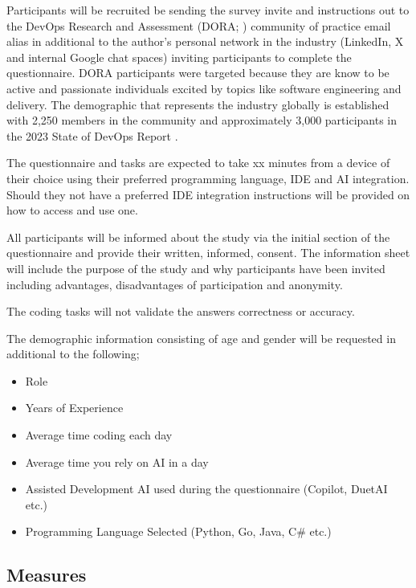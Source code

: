\documentclass[man]{apa7}
\begin{document}
Participants will be recruited be sending the survey invite and instructions out to the  DevOps Research and Assessment (DORA; \cite{Humble2018Accelerate:Organizations}) community of practice \parencite{DORACommunity} email alias in additional to the author's personal network in the industry (LinkedIn, X and internal Google chat spaces) inviting participants to complete the questionnaire. DORA participants were targeted because they are know to be active and passionate individuals excited by topics like software engineering and delivery. The demographic that represents the industry globally is established with 2,250 members in the community and approximately 3,000 participants in the 2023 State of DevOps Report \parencite{2023State2023}.

The questionnaire and tasks are expected to take xx minutes from a device of their choice using their preferred programming language, IDE and AI integration. Should they not have a preferred IDE integration instructions will be provided on how to access and use one.

All participants will be informed about the study via the initial section of the questionnaire and provide their written, informed, consent. The information sheet will include the purpose of the study and why participants have been invited including advantages, disadvantages of participation and anonymity. 

The coding tasks will not validate the answers correctness or accuracy.


The demographic information consisting of age and gender will be requested in additional to the following;

\begin{itemize}
    \item Role
    \item Years of Experience
    \item Average time coding each day
    \item Average time you rely on AI in a day
    \item Assisted Development AI used during the questionnaire (Copilot, DuetAI etc.)
    \item Programming Language Selected (Python, Go, Java, C\# etc.)
\end{itemize}

\subsection{Measures}
\end{document}
